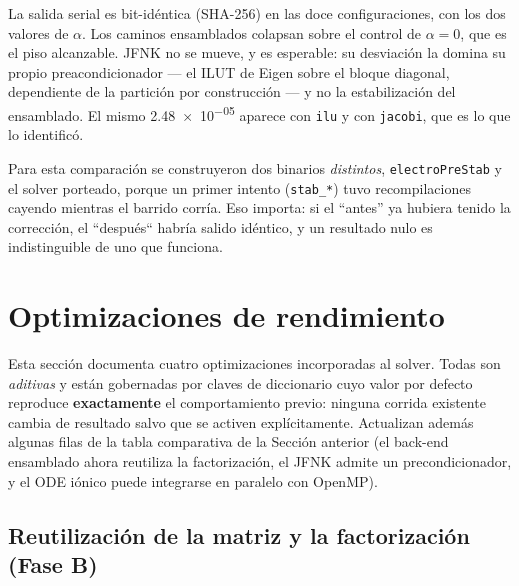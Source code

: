 \documentclass[11pt,a4paper]{article}
\newcommand{\code}[1]{\texttt{\small #1}}
\begin{document}
La salida serial es bit-idéntica (SHA-256) en las doce configuraciones, con los
dos valores de $\alpha$. Los caminos ensamblados colapsan sobre el control de
$\alpha=0$, que es el piso alcanzable. JFNK no se mueve, y es esperable: su
desviación la domina su propio preacondicionador --- el ILUT de Eigen sobre el
bloque diagonal, dependiente de la partición por construcción --- y no la
estabilización del ensamblado. El mismo \num{2.48e-05} aparece con \code{ilu} y
con \code{jacobi}, que es lo que lo identificó.

Para esta comparación se construyeron dos binarios \emph{distintos},
\code{electroPreStab} y el solver porteado, porque un primer intento
(\code{stab\_*}) tuvo recompilaciones cayendo mientras el barrido corría. Eso
importa: si el ``antes'' ya hubiera tenido la corrección, el ``después`` habría
salido idéntico, y un resultado nulo es indistinguible de uno que funciona.


\section{Optimizaciones de rendimiento}
\label{sec:optim}

Esta sección documenta cuatro optimizaciones incorporadas al solver. Todas son
\emph{aditivas} y están gobernadas por claves de diccionario cuyo valor por
defecto reproduce \textbf{exactamente} el comportamiento previo: ninguna corrida
existente cambia de resultado salvo que se activen explícitamente. Actualizan
además algunas filas de la tabla comparativa de la Sección anterior (el back-end
ensamblado ahora reutiliza la factorización, el JFNK admite un precondicionador,
y el ODE iónico puede integrarse en paralelo con OpenMP).

\subsection{Reutilización de la matriz y la factorización (Fase B)}
\label{sec:optim-B}
\end{document}
